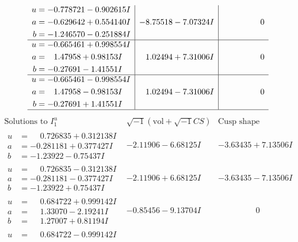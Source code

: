 \documentclass[1p]{elsarticle_modified}
\theoremstyle{definition}
\newcommand{\I}{\sqrt{-1}}
\begin{document}
$$\begin{array}{c|c|c}
\begin{aligned}
u &= -0.778721 - 0.902615 I \\
a &= -0.629642 + 0.554140 I \\
b &= -1.246570 - 0.251884 I\end{aligned}
 & -8.75518 - 7.07324 I & \phantom{-0.000000 } 0 \\ \hline\begin{aligned}
u &= -0.665461 + 0.998554 I \\
a &= \phantom{-}1.47958 + 0.98153 I \\
b &= -0.27691 - 1.41551 I\end{aligned}
 & \phantom{-}1.02494 + 7.31006 I & \phantom{-0.000000 } 0 \\ \hline\begin{aligned}
u &= -0.665461 - 0.998554 I \\
a &= \phantom{-}1.47958 - 0.98153 I \\
b &= -0.27691 + 1.41551 I\end{aligned}
 & \phantom{-}1.02494 - 7.31006 I & \phantom{-0.000000 } 0\\
 \hline 
 \end{array}$$\newpage$$\begin{array}{c|c|c}  
\text{Solutions to }I^u_{1}& \I (\text{vol} + \sqrt{-1}CS) & \text{Cusp shape}\\
 \hline 
\begin{aligned}
u &= \phantom{-}0.726835 + 0.312138 I \\
a &= -0.281181 + 0.377427 I \\
b &= -1.23922 - 0.75437 I\end{aligned}
 & -2.11906 - 6.68125 I & -3.63435 + 7.13506 I \\ \hline\begin{aligned}
u &= \phantom{-}0.726835 - 0.312138 I \\
a &= -0.281181 - 0.377427 I \\
b &= -1.23922 + 0.75437 I\end{aligned}
 & -2.11906 + 6.68125 I & -3.63435 - 7.13506 I \\ \hline\begin{aligned}
u &= \phantom{-}0.684722 + 0.999142 I \\
a &= \phantom{-}1.33070 - 2.19241 I \\
b &= \phantom{-}1.27007 + 0.81194 I\end{aligned}
 & -0.85456 - 9.13704 I & \phantom{-0.000000 } 0 \\ \hline\begin{aligned}
u &= \phantom{-}0.684722 - 0.999142 I \\

\end{aligned}
\end{array}$$
\end{document}

